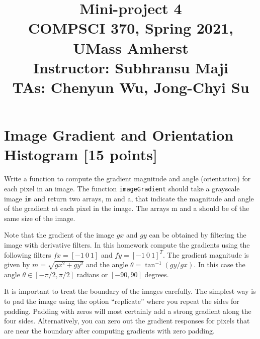 \documentclass[10pt,letterpaper]{article}
\title{
	Mini-project 4\\
	\Large{COMPSCI 370, Spring 2021, UMass Amherst} \\
	\Large{Instructor: Subhransu Maji} \\
	\Large{TAs: Chenyun Wu, Jong-Chyi Su}
}
\date{}
\newcommand{\cmd}[1] {{\color{blue}\texttt{#1}}}
\begin{document}
\maketitle

\renewcommand\thesubsection{\thesection.\alph{subsection}}


\newpage


\section{Image Gradient and Orientation Histogram [15 points]}
Write a function to compute the gradient magnitude and angle (orientation) for
each pixel in an image. 
The function \cmd{imageGradient}
should take a grayscale image \cmd{im} and return two arrays, m and a,
that indicate the magnitude and angle of the gradient at each pixel in
the image. The arrays m and a should be of the same size of the image.

Note that the gradient of the image $gx$ and $gy$ can be obtained by
filtering the image with derivative filters. In this homework compute
the gradients using the following filters
$fx = [-1~0~1]$ and $fy = [-1~ 0 ~1]^T$.
The gradient magnitude is given by $m = \sqrt{gx^2 + gy^2}$ and the angle
$\theta = \tan^{-1}(gy/gx)$. In this case the angle $\theta \in
[-\pi/2,\pi/2]$ radians or $[-90, 90]$ degrees.

It is important to treat the boundary of the images carefully.
The simplest way is to pad the image using the option ``replicate''
where you repeat the sides for padding.
Padding with zeros will most certainly add a strong gradient
along the four sides.
Alternatively, you can zero out the gradient responses for pixels that
are near the boundary after computing gradients with
zero padding.
\end{document}
